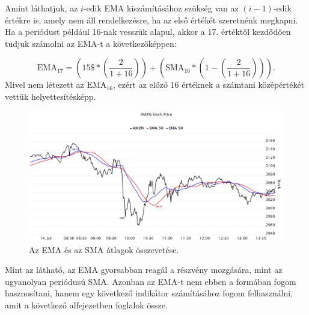 Amint láthatjuk, az $i$-edik EMA kiszámításához szükség van az $(i-1)$-edik értékre is, amely nem áll rendelkezésre, ha az első értékét szeretnénk megkapni. Ha a periódust például 16-nak vesszük alapul, akkor a 17. értéktől kezdődően tudjuk számolni az EMA-t a következőképpen:

$$
\text{EMA}_{17} = \left( \text{15\$} * \left(\frac{2}{1+16}\right)\right) + \left(\text{SMA}_{16} * \left(1-\left(\frac{2}{1+16}\right)\right)\right).
$$
Mivel nem létezett az $\text{EMA}_{16}$, ezért az előző 16 értéknek a számtani középértékét vettük helyettesítésképp.

\begin{figure}[ht]
\centering
\includegraphics[scale=0.22]{images/emasma.png}
\caption{Az EMA és az SMA átlagok összevetése.}
\label{fig:emasma}
\end{figure}
\noindent Mint az látható, az EMA gyorsabban reagál a részvény mozgására, mint az ugyanolyan periódusú SMA. Azonban az EMA-t nem ebben a formában fogom hasznosítani, hanem egy következő indikátor számításához fogom felhasználni, amit a következő alfejezetben foglalok össze.
\newpage


